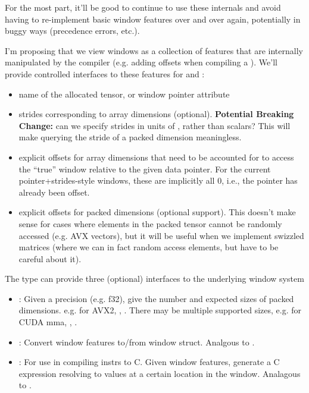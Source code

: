 \filbreak
For the most part, it'll be good to continue to use these internals and avoid having to re-implement basic window features over and over again, potentially in buggy ways (precedence errors, etc.).

\filbreak
I'm proposing that we view windows as a collection of features that are internally manipulated by the compiler (e.g. adding offsets when compiling a ).
We'll provide controlled interfaces to these features for  and :
\begin{itemize}
  \item {} name of the allocated tensor, or window  pointer attribute
  \filbreak
  \item {} strides corresponding to array dimensions (optional).
    \textbf{Potential Breaking Change:} can we specify strides in units of , rather than scalars?
    This will make querying the stride of a packed dimension meaningless.
  \filbreak
  \item {} explicit offsets for array dimensions that need to be accounted for to access the ``true'' window relative to the given data pointer. For the current pointer+strides-style windows, these are implicitly all 0, i.e., the  pointer has already been offset.
  \filbreak
  \item {} explicit offsets for packed dimensions (optional support). This doesn't make sense for cases where elements in the packed tensor cannot be randomly accessed (e.g. AVX vectors), but it will be useful when we implement swizzled matrices (where we can in fact random access elements, but have to be careful about it).
\end{itemize}

\filbreak
The  type can provide three (optional) interfaces to the underlying window system
\begin{itemize}
  \item {}: Given a precision (e.g. f32), give the number and expected sizes of packed dimensions. e.g. for AVX2, , . There may be multiple supported sizes, e.g. for CUDA mma, , .
  \item {}: Convert window features to/from window struct. Analgous to .
  \filbreak
  \item {}: For use in compiling instrs to C. Given window features, generate a C expression resolving to values at a certain location in the window. Analagous to .
\end{itemize}

